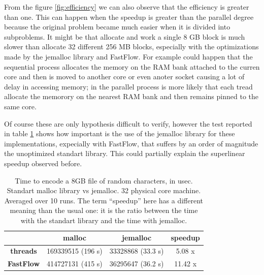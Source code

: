 \documentclass[12pt, letterpaper]{article}
\begin{document}
From the figure \ref{fig:efficiency} we can also observe that the efficiency is greater than one. This can happen when the speedup is greater than the parallel degree because the original problem became much easier when it is divided into subproblems. It might be that allocate and work a single 8 GB block is much slower than allocate 32 different 256 MB blocks, especially with the optimizations made by the jemalloc library and FastFlow. For example could happen that the sequential process allocates the memory on the RAM bank attached to the curren core and then is moved to another core or even anoter socket causing a lot of delay in accessing memory; in the parallel process is more likely that each tread allocate the memorory on the nearest RAM bank and then remains pinned to the same core.

Of course these are only hypothesis difficult to verify, however the test reported in table \ref{tab:jemalloc} shows how important is the use of the jemalloc library for these implementations, expecially with FastFlow, that suffers by an order of magnitude the unoptimized standart library. This could partially explain the superlinear speedup observed before.


\begin{table}[h]
    \begin{center}
    \begin{tabular}{c c c c}
        & \textbf{malloc} & \textbf{jemalloc} & speedup\\
        \hline
        \textbf{threads} &  169339515 (196 s) & 33328868 (33.3 s) & 5.08 x \\
        \hline
        \textbf{FastFlow} &  414727131 (415 s) & 36295647 (36.2 s) & 11.42 x \\
        \hline
    \end{tabular}
    \caption{Time to encode a 8GB file of random characters, in usec. Standart malloc library vs jemalloc. 32 physical core machine. Averaged over 10 runs. The term ``speedup'' here has a different meaning than the usual one: it is the ratio between the time with the standart library and the time with jemalloc.}    
    \label{tab:jemalloc}
    \end{center}
    \end{table}






\newpage \FloatBarrier


\end{document}
